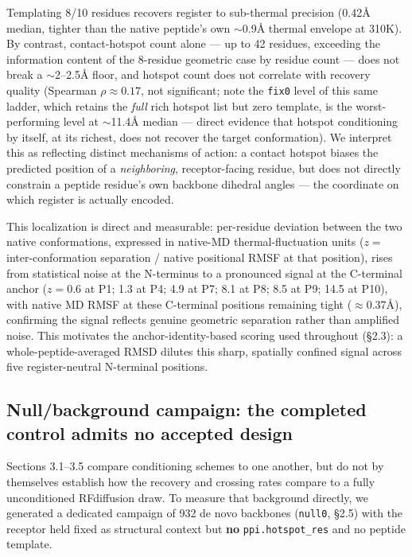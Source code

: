 \documentclass[letterpaper]{article}
\begin{document}
Templating 8/10 residues recovers register to sub-thermal precision (0.42\AA{} median, tighter than the
native peptide's own $\sim$0.9\AA{} thermal envelope at 310K). By contrast, contact-hotspot count alone --- up to
42 residues, exceeding the information content of the 8-residue geometric case by residue count --- does
not break a $\sim$2--2.5\AA{} floor, and hotspot count does not correlate with recovery quality (Spearman
$\rho\approx0.17$, not significant; note the \texttt{fix0} level of this same ladder, which retains the
\textit{full} rich hotspot list but zero template, is the worst-performing level at $\sim$11.4\AA{} median
--- direct evidence that hotspot conditioning by itself, at its richest, does not recover the target
conformation). We interpret this as reflecting distinct mechanisms of action: a contact hotspot biases the
predicted position of a \textit{neighboring}, receptor-facing residue, but does not directly constrain a
peptide residue's own backbone dihedral angles --- the coordinate on which register is actually encoded.

This localization is direct and measurable: per-residue deviation between the two native conformations,
expressed in native-MD thermal-fluctuation units ($z=$ inter-conformation separation / native positional
RMSF at that position), rises from statistical noise at the N-terminus to a pronounced signal at the
C-terminal anchor ($z=0.6$ at P1; 1.3 at P4; 4.9 at P7; 8.1 at P8; 8.5 at P9; 14.5 at P10), with native MD
RMSF at these C-terminal positions remaining tight ($\approx$0.37\AA{}), confirming the signal reflects
genuine geometric separation rather than amplified noise. This motivates the anchor-identity-based scoring
used throughout (\S2.3): a whole-peptide-averaged RMSD dilutes this sharp, spatially confined signal across
five register-neutral N-terminal positions.

\subsection{Null/background campaign: the completed control admits no accepted design}

Sections 3.1--3.5 compare conditioning schemes to one another, but do not by themselves establish how the
recovery and crossing rates compare to a fully unconditioned RFdiffusion draw. To measure that background
directly, we generated a dedicated campaign of 932 de novo backbones (\texttt{null0}, \S2.5) with the
receptor held fixed as structural context but \textbf{no} \texttt{ppi.hotspot\_res} and no peptide template.
\end{document}
